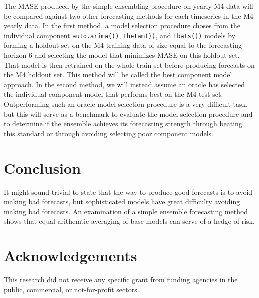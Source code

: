 \documentclass[11pt,3p,review,authoryear]{elsarticle}
\begin{document}
The MASE produced by the simple ensembling procedure on yearly M4 data will be compared against two other forecasting methods for each timeseries in the M4 yearly data. In the first method, a model selection procedure choses from the individual component \texttt{auto.arima())}, \texttt{thetam())}, and \texttt{tbats())} models by forming a holdout set on the M4 training data of size equal to the forecasting horizon 6 and selecting the model that minimizes MASE on this holdout set. That model is then retrained on the whole train set before producing forecasts on the M4 holdout set. This method will be called the best component model approach. In the second method, we will instead assume an oracle has selected the individual component model that performs best on the M4 test set. Outperforming such an oracle model selection procedure is a very difficult task, but this will serve as a benchmark to evaluate the model selection procedure and to determine if the ensemble achieves its forecasting strength through beating this standard or through avoiding selecting poor component models.





\section{Conclusion}
It might sound trivial to state that the way to produce good forecasts is to avoid making bad forecasts, but sophisticated models have great difficulty avoiding making bad forecasts. An examination of a simple ensemble forecasting method shows that equal arithemtic averaging of base models can serve of a hedge of risk.

\section*{Acknowledgements}

This research did not receive any specific grant from funding agencies in the public, commercial, or not-for-profit sectors.



\end{document}
